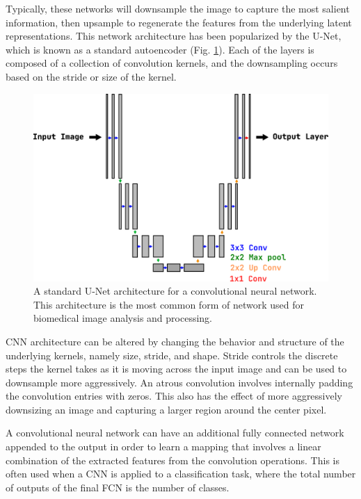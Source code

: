 Typically, these networks will downsample the image to capture the most salient information, then upsample to regenerate the features from the underlying latent representations.
This network architecture has been popularized by the U-Net, which is known as a standard autoencoder (Fig. \ref{fig:unet}).
Each of the layers is composed of a collection of convolution kernels, and the downsampling occurs based on the stride or size of the kernel.

\begin{figure}[h!]
    \centering
    \includegraphics[width=0.7\linewidth]{figs/background/png/u-net.png}
    \caption[A standard U-Net architecture for a convolutional neural network]{A standard U-Net architecture for a convolutional neural network. This architecture is the most common form of network used for biomedical image analysis and processing.}
    \label{fig:unet}
  \end{figure}


CNN architecture can be altered by changing the behavior and structure of the underlying kernels, namely size, stride, and shape.
Stride controls the discrete steps the kernel takes as it is moving across the input image and can be used to downsample more aggressively.
An atrous convolution involves internally padding the convolution entries with zeros. This also has the effect of more aggressively downsizing an image and capturing a larger region around the center pixel.

A convolutional neural network can have an additional fully connected network appended to the output in order to learn a mapping that involves a linear combination of the extracted features from the convolution operations.
This is often used when a CNN is applied to a classification task, where the total number of outputs of the final FCN is the number of classes.

